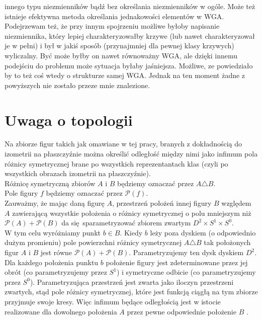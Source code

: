 \documentclass[a4paper, 12pt, twosided]{article}
\begin{document}
 innego 
typu
niezmienników bądź bez określania niezmienników w ogóle. Może też istnieje efektywna metoda 
 określania
jednakowości elementów w WGA. Podejrzewam też, że przy innym spojrzeniu możliwe byłoby napisanie 
niezmiennika, który lepiej charakteryzowałby krzywe (lub nawet charakteryzował je w pełni) i 
był w jakiś sposób (przynajmniej dla pewnej klasy krzywych) wyliczalny. Być może byłby on nawet 
równoważny WGA, ale dzięki innemu podejściu do problemu może sytuacja byłaby jaśniejsza. 
Możliwe, ze powiedziało by to też coś wtedy o strukturze samej WGA. Jednak na ten moment żadne 
z powyższych nie zostało przeze mnie znalezione.

\section{Uwaga o topologii}
Na zbiorze figur takich jak omawiane w tej pracy, branych z dokładnością do izometrii na
płaszczyźnie można określić odległość między nimi jako infimum pola różnicy symetrycznej brane po 
wszystkich
reprezentantach klas (czyli po wszystkich obrazach izometrii na płaszczyźnie). \\ 
Różnicę symetryczną zbiorów $A$ i $B$ będziemy oznaczać przez $A \triangle B$. \\
Pole figury $f$ będziemy oznaczać przez $\mathcal{P}(f)$. \\
\indent Zauważmy, że mając daną figurę $A$, przestrzeń położeń innej figury $B$ względem $A$ 
zawierającą wszystkie położenia o różnicy symetrycznej o polu mniejszym niż $\mathcal{P}(A) 
+ \mathcal{P}(B)$ da 
się sparametryzować zbiorem zwartym $D^2 \times S^1 \times S^0$. \\ 
\indent W tym celu wyróżniamy punkt $b \in B$. Kiedy $b$ leży poza dyskiem (o odpowiednio dużym 
promieniu) pole powierzchni różnicy symetrycznej $A \triangle B$ tak położonych figur $A$ i $B$ 
jest równe $\mathcal{P}(A) + \mathcal{P}(B)$. Parametryzujemy 
ten dysk dyskiem $D^2$. Dla każdego położenia punktu $b$ położenie figury jest zdeterminowane 
przez jej obrót (co parametryzujemy przez $S^1$) i symetryczne odbicie (co parametryzujemy 
przez $S^0$). Parametryzująca przestrzeń jest zwarta jako iloczyn przestrzeni zwartych, stąd 
pole różnicy symetrycznej, które jest funkcją ciągłą na tym zbiorze
przyjmuje swoje kresy. Więc infimum będące odległością jest w istocie realizowane
dla dowolnego położenia $A$ przez 
pewne odpowiednie położenie $B$ . \\
\end{document}
